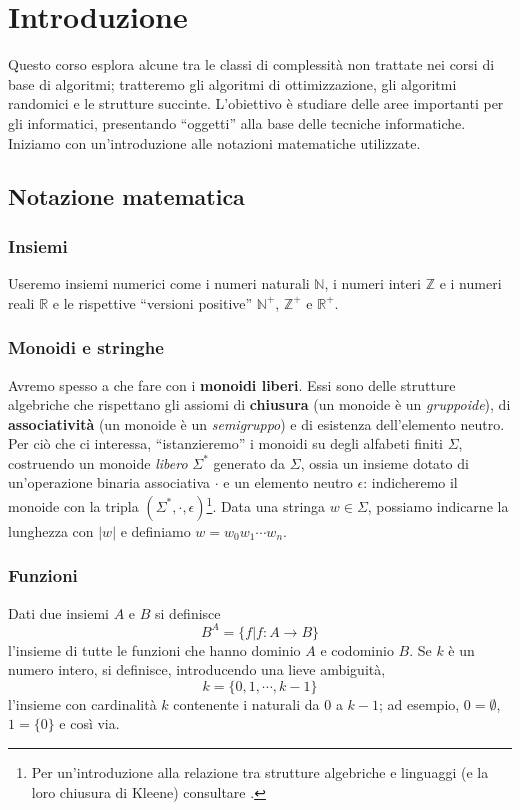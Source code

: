 
\chapter{Introduzione}
Questo corso esplora alcune tra le classi di complessità non trattate nei corsi di base di algoritmi;
tratteremo gli algoritmi di ottimizzazione, gli algoritmi randomici e le strutture succinte.
L'obiettivo è studiare delle aree importanti per gli informatici, presentando ``oggetti'' alla base delle
tecniche informatiche. Iniziamo con un'introduzione alle notazioni matematiche utilizzate.

\section{Notazione matematica}
\subsection{Insiemi}
Useremo insiemi numerici come i numeri naturali $\mathbb{N}$,
i numeri interi $\mathbb{Z}$ e i numeri reali $\mathbb{R}$ e le rispettive
``versioni positive'' $\mathbb{N}^+$,  $\mathbb{Z}^+$ e $\mathbb{R}^+$.

\subsection{Monoidi e stringhe}
Avremo spesso a che fare con i {\bf monoidi liberi}. Essi sono delle strutture
algebriche che rispettano gli assiomi di {\bf chiusura} (un monoide è un \textit{gruppoide}),
di {\bf associatività} (un monoide è un \textit{semigruppo}) e di esistenza dell'elemento neutro.
Per ciò che ci interessa, ``istanzieremo'' i monoidi su degli alfabeti finiti $\Sigma$, costruendo
un monoide \textit{libero}\textit{} $\Sigma^*$ generato da $\Sigma$, ossia un insieme dotato
di un'operazione binaria associativa $\cdot$ e un elemento neutro $\epsilon$:
indicheremo il monoide con la tripla $(\Sigma^*, \cdot, \epsilon)$\footnote{
	Per un'introduzione alla relazione tra strutture algebriche e linguaggi (e la loro
	chiusura di Kleene) consultare \cite{sakarovitch_2009}.}.
Data una stringa $w \in \Sigma$, possiamo indicarne la lunghezza con
$|w|$ e definiamo $w = w_0 w_1\cdots w_n$.

\subsection{Funzioni}
Dati due insiemi $A$ e $B$ si definisce
$$
	B^A = \{f | f: A \rightarrow B\}
$$
l'insieme di tutte le funzioni che hanno dominio $A$ e codominio $B$.
Se $k$ è un numero intero, si definisce, introducendo una lieve ambiguità,
$$
	k = \{0,1,\cdots,k-1\}
$$
l'insieme con cardinalità $k$ contenente i naturali da $0$ a $k-1$;
ad esempio, $0 = \emptyset$, $1 = \{0\}$ e così via.


